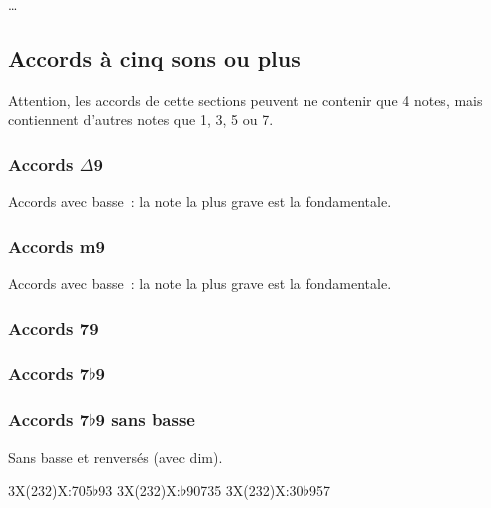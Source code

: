 \documentclass[11pt]{article}
\begin{document}
\ldots

\subsection{Accords à cinq sons ou plus} \label{cinq ou plus}

Attention, les accords de cette sections peuvent ne contenir que 4 notes,
mais contiennent d’autres notes que 1, 3, 5 ou 7.

\subsubsection{Accords $\Delta$9}

Accords avec basse : la note la plus grave est la fondamentale.


\subsubsection{Accords m9}

Accords avec basse : la note la plus grave est la fondamentale.


\subsubsection{Accords 79}


\subsubsection{Accords 7$\flat$9}


\subsubsection{Accords 7$\flat$9 sans basse}

Sans basse et renversés (avec dim).

  {3X(232)X:705{$\flat$9}3}
  {3X(232)X:{$\flat$9}0735}
  {3X(232)X:30{$\flat$9}57}
\end{document}
